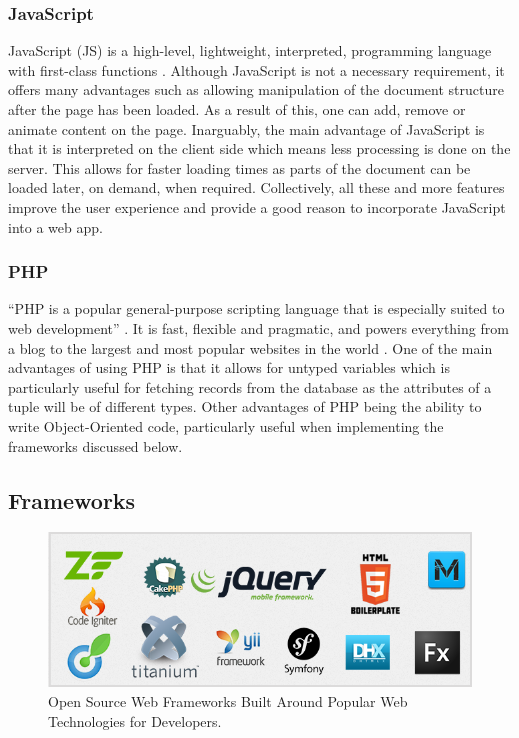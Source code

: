\subsubsection{JavaScript}
JavaScript (JS) is a high-level, lightweight, interpreted, programming language with first-class functions \cite{Mozilla:JavaScript}. Although JavaScript is not a necessary requirement, it offers many advantages such as allowing manipulation of the document structure after the page has been loaded. As a result of this, one can add, remove or animate content on the page. Inarguably, the main advantage of JavaScript is that it is interpreted on the client side which means less processing is done on the server. This allows for faster loading times as parts of the document can be loaded later, on demand, when required. Collectively, all these and more features improve the user experience and provide a good reason to incorporate JavaScript into a web app.

\subsubsection{PHP} 
``PHP is a popular general-purpose scripting language that is especially suited to web development'' \cite{PHP:Home}. It is fast, flexible and pragmatic, and powers everything from a blog to the largest and most popular websites in the world \cite{PHP:Home}. One of the main advantages of using PHP is that it allows for untyped variables which is particularly useful for fetching records from the database as the attributes of a tuple will be of different types. Other advantages of PHP being the ability to write Object-Oriented code, particularly useful when implementing the frameworks discussed below.

\subsection{Frameworks}
\begin{figure}[H]
  \centering
  \includegraphics[width=1.0\textwidth]{Images/Research/Technologies/WebFrameworks}
  \caption{Open Source Web Frameworks Built Around Popular Web Technologies for Developers.} \label{fig:WebFrameworks} 
\end{figure}


